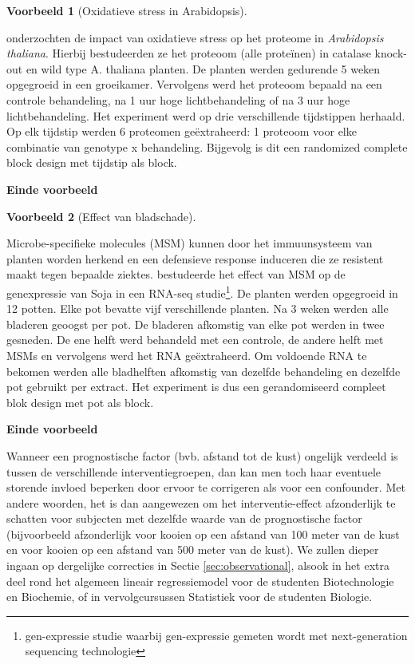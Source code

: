 \documentclass[
  12pt,dutch]{book}
\theoremstyle{definition}
\theoremstyle{definition}
\newtheorem{example}{Voorbeeld}[chapter]
\theoremstyle{definition}
\theoremstyle{definition}
\theoremstyle{remark}
\begin{document}
\begin{example}[Oxidatieve stress in Arabidopsis]
\protect\hypertarget{exm:unnamed-chunk-73}{}\label{exm:unnamed-chunk-73}~
\end{example}

\citet{Jacques2015} onderzochten de impact van oxidatieve stress op het proteome in \emph{Arabidopsis thaliana}. Hierbij bestudeerden ze het proteoom (alle proteïnen) in catalase knock-out en wild type A. thaliana planten. De planten werden gedurende 5 weken opgegroeid in een groeikamer. Vervolgens werd het proteoom bepaald na een controle behandeling, na 1 uur hoge lichtbehandeling of na 3 uur hoge lichtbehandeling. Het experiment werd op drie verschillende tijdstippen herhaald. Op elk tijdstip werden 6 proteomen geëxtraheerd: 1 proteoom voor elke combinatie van genotype x behandeling. Bijgevolg is dit een randomized complete block design met tijdstip als block.

\textbf{Einde voorbeeld}

\begin{example}[Effect van bladschade]
\protect\hypertarget{exm:unnamed-chunk-74}{}\label{exm:unnamed-chunk-74}~
\end{example}

Microbe-specifieke molecules (MSM) kunnen door het immuunsysteem van planten worden herkend en een defensieve response induceren die ze resistent maakt tegen bepaalde ziektes. \citet{Valdes2014} bestudeerde het effect van MSM op de genexpressie van Soja in een RNA-seq studie\footnote{gen-expressie studie waarbij gen-expressie gemeten wordt met next-generation sequencing technologie}. De planten werden opgegroeid in 12 potten. Elke pot bevatte vijf verschillende planten. Na 3 weken werden alle bladeren geoogst per pot. De bladeren afkomstig van elke pot werden in twee gesneden. De ene helft werd behandeld met een controle, de andere helft met MSMs en vervolgens werd het RNA geëxtraheerd. Om voldoende RNA te bekomen werden alle bladhelften afkomstig van dezelfde behandeling en dezelfde pot gebruikt per extract. Het experiment is dus een gerandomiseerd compleet blok design met pot als block.

\textbf{Einde voorbeeld}

Wanneer een prognostische factor (bvb. afstand tot de kust) ongelijk verdeeld is
tussen de verschillende interventiegroepen, dan kan men toch haar eventuele
storende invloed beperken door ervoor te corrigeren als voor een confounder.
Met andere woorden, het is dan aangewezen om het interventie-effect
afzonderlijk te schatten voor subjecten met dezelfde waarde van de
prognostische factor (bijvoorbeeld afzonderlijk voor kooien op een afstand van 100 meter van de kust en voor kooien op een afstand van 500 meter van de kust). We zullen dieper ingaan op dergelijke correcties
in Sectie \ref{sec:observational}, alsook in het extra deel rond het algemeen lineair regressiemodel voor de studenten Biotechnologie en Biochemie, of in vervolgcursussen Statistiek voor de studenten Biologie.
\end{document}
